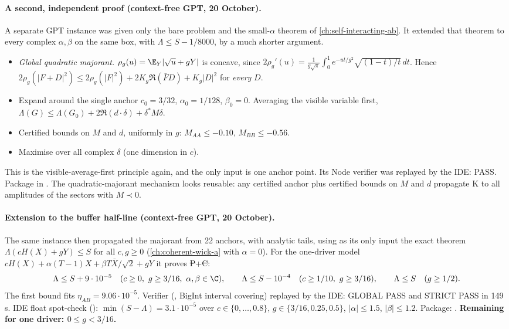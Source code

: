 \paragraph{A second, independent proof (context-free GPT, 20 October).} A separate GPT instance was given only the bare problem and the small-$\alpha$ theorem of
\autoref{ch:self-interacting-ab}. It extended that theorem to every complex $\alpha,\beta$ on the same box, with $\Lambda\le S-1/8000$, by a much shorter argument.
\begin{itemize}
\item \emph{Global quadratic majorant.} $\rho_g(u)=\E_Y|\sqrt u+gY|$ is concave, since $2\rho_g'(u)=\frac1{g\sqrt\pi}\int_0^1e^{-ut/g^2}\sqrt{(1-t)/t}\,dt$. Hence
$2\rho_g(|F+D|^2)\le2\rho_g(|F|^2)+2K_g\Re(\bar FD)+K_g|D|^2$ for \emph{every} $D$.
\item Expand around the single anchor $c_0=3/32$, $\alpha_0=1/128$, $\beta_0=0$. Averaging the visible variable first, $\Lambda(G)\le\Lambda(G_0)+2\Re(d\cdot\delta)+\delta^*M\delta$.
\item Certified bounds on $M$ and $d$, uniformly in $g$: $M_{AA}\le-0.10$, $M_{BB}\le-0.56$.
\item Maximise over all complex $\delta$ (one dimension in $c$).
\end{itemize}
This is the visible-average-first principle again, and the only input is one anchor point. Its Node verifier was replayed by the IDE: PASS. Package in .
The quadratic-majorant mechanism looks reusable: any certified anchor plus certified bounds on $M$ and $d$ propagate K to all amplitudes of the sectors with $M\prec0$.

\paragraph{Extension to the buffer half-line (context-free GPT, 20 October).} The same instance then propagated the majorant from 22 anchors, with analytic tails, using as its only
input the exact theorem $\Lambda(cH(X)+gY)\le S$ for all $c,g\ge0$ (\autoref{ch:coherent-wick-a} with $\alpha=0$). For the one-driver model
$cH(X)+\alpha(T-1)X+\beta T\bar X/\sqrt2+gY$ it proves \st{P}+\st{C}:
\[
\Lambda\le S+9\cdot10^{-5}\quad(c\ge0,\ g\ge3/16,\ \alpha,\beta\in\C),\qquad \Lambda\le S-10^{-4}\quad(c\ge1/10,\ g\ge3/16),\qquad \Lambda\le S\quad(g\ge1/2).
\]
The first bound fits $\eta_{AB}=9.06\cdot10^{-5}$. Verifier (, BigInt interval covering) replayed by the IDE: GLOBAL PASS and STRICT PASS in 149\,s. IDE float spot-check
(): $\min(S-\Lambda)=3.1\cdot10^{-5}$ over $c\in\{0,\dots,0.8\}$, $g\in\{3/16,0.25,0.5\}$, $|\alpha|\le1.5$, $|\beta|\le1.2$. Package:
. \textbf{Remaining for one driver: $0\le g<3/16$.}


